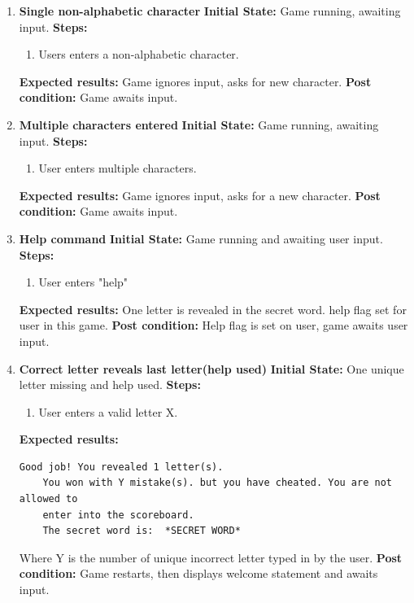 \documentclass{article}
\begin{document}
\begin{enumerate}
	\item \textbf{Single non-alphabetic character}\newline
	\textbf{Initial State:} Game running, awaiting input.\newline
	\textbf{Steps:}
	\begin{enumerate}
	\item Users enters a non-alphabetic character.
	\end{enumerate}
	\textbf{Expected results:} Game ignores input, asks for new character.\newline
	\textbf{Post condition:} Game awaits input.

	\item \textbf{Multiple characters entered}\newline
	\textbf{Initial State:} Game running, awaiting input.\newline
	\textbf{Steps:}
	\begin{enumerate}
	\item User enters multiple characters.
	\end{enumerate}
	\textbf{Expected results:} Game ignores input, asks for a new character.\newline
	\textbf{Post condition:} Game awaits input.

	\item \textbf{Help command}\newline
	\textbf{Initial State:} Game running and awaiting user input.\newline
	\textbf{Steps:}
	\begin{enumerate}
	\item User enters "help"
	\end{enumerate}
	\textbf{Expected results:} One letter is revealed in the secret word. help flag set for user in this game.\newline
	\textbf{Post condition:} Help flag is set on user, game awaits user input.\newline

	\item \textbf{Correct letter reveals last letter(help used)}\newline
	\textbf{Initial State:} One unique letter missing and help used.\newline
	\textbf{Steps:}
	\begin{enumerate}
	\item User enters a valid letter X.
	\end{enumerate}
	\textbf{Expected results:}
	\begin{lstlisting}[breaklines, gobble=8]
	Good job! You revealed 1 letter(s).
	You won with Y mistake(s). but you have cheated. You are not allowed to 
	enter into the scoreboard.
	The secret word is:  *SECRET WORD*
	\end{lstlisting}
	Where Y is the number of unique incorrect letter typed in by the user.\newline
	\textbf{Post condition:} Game restarts, then displays welcome statement and awaits input.\newline


\end{enumerate}
\end{document}
